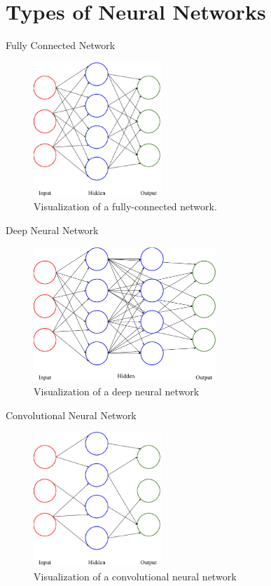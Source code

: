 \documentclass{beamer}
\begin{document}
  \section{Types of Neural Networks}
  \begin{frame}{Fully Connected Network}
    \begin{figure}[ht!]
      \centering
      \includegraphics[height=2in]{../figures/neural_network.eps}
      \caption{Visualization of a fully-connected network.}
      \label{fig:nn}
    \end{figure} 
  \end{frame}

  \begin{frame}{Deep Neural Network}
    \begin{figure}[ht!]
      \centering
      \includegraphics[height=2in]{../figures/deep_nn.eps}
      \caption{Visualization of a deep neural network}
      \label{fig:dnn}
    \end{figure}
  \end{frame}

  \begin{frame}{Convolutional Neural Network}
    \begin{figure}[ht!]
      \centering
      \includegraphics[height=2in]{../figures/convolutional_nn.eps}
      \caption{Visualization of a convolutional neural network}
      \label{fig:cnn}
    \end{figure}
  \end{frame}
\end{document}
